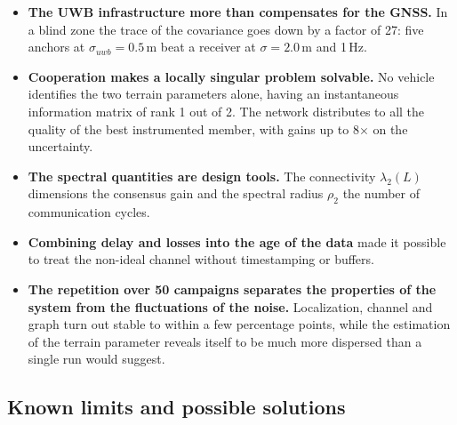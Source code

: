 \documentclass[conference,9pt]{IEEEtran}
\begin{document}
\begin{itemize}
\item \textbf{The UWB infrastructure more than compensates for the GNSS.} In a
      blind zone the trace of the covariance goes down by a factor of 27: five
      anchors at $\sigma_{uwb} = 0.5$\,m beat a receiver at $\sigma = 2.0$\,m and
      1\,Hz.
\item \textbf{Cooperation makes a locally singular problem solvable.} No
      vehicle identifies the two terrain parameters alone, having an
      instantaneous information matrix of rank 1 out of 2. The network
      distributes to all the quality of the best instrumented member, with
      gains up to 8$\times$ on the uncertainty.
\item \textbf{The spectral quantities are design tools.} The connectivity
      $\lambda_2(L)$ dimensions the consensus gain and the spectral radius
      $\rho_2$ the number of communication cycles.
\item \textbf{Combining delay and losses into the age of the data} made it
      possible to treat the non-ideal channel without timestamping or buffers.
\item \textbf{The repetition over 50 campaigns separates the properties of the
      system from the fluctuations of the noise.} Localization, channel and
      graph turn out stable to within a few percentage points, while the
      estimation of the terrain parameter reveals itself to be much more
      dispersed than a single run would suggest.
\end{itemize}

\subsection{Known limits and possible solutions}
\end{document}

